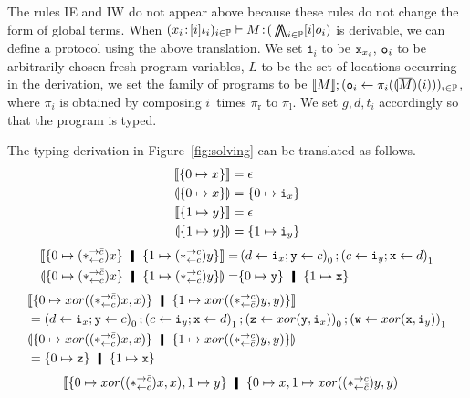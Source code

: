 The rules IE and IW do not appear above because these rules do not
change the form of global terms.
When $({x_i} \mathord{\colon\kern -2pt}{[i]\iota_i})_{i\in\mathbb{P}}
\vdash{M} \mathord{\colon\kern -2pt}{(}\operatorname*{\bigwedge\kern -8pt \bigwedge}_{i\in \mathbb{P}}[i]o_i)$ is
derivable,
we can define a protocol using the above translation.
We set $\mathtt i_i$ to be ${\texttt{x}}_{x_i}$, ${\texttt{o}}_i$ to be arbitrarily
chosen fresh program variables, $L$ to be the set of locations
occurring in the derivation, we set the family of programs to be
$\llbracket{M}\rrbracket; ({\texttt{o}}_i\leftarrow \pi_i(\llparenthesis{\overline M}\rrparenthesis(i)))_{i\in\mathbb{P}}$,
where $\pi_i$ is obtained by composing $i$~times $\pi_{\mathrm r}$ to
$\pi_{\mathrm l}$.
We set $g,d,t_i$ accordingly so that the program is typed.
 \begin{example}
  The typing derivation in Figure~\ref{fig:solving} can be translated
  as follows.
  \begin{align*}
   \llbracket{{\{0\mapsto x\}}}\rrbracket&= \epsilon\\
   \llparenthesis{{\{0\mapsto x\}}}\rrparenthesis &=
   \{0\mapsto \texttt{i}_x\} \\
   \llbracket{{\{1\mapsto y\}}}\rrbracket &=
   \epsilon\\
   \llparenthesis{{\{1\mapsto y\}}}\rrparenthesis &=
   \{1\mapsto \texttt{i}_y\}
  \end{align*}
  \begin{align*}
   \semo{{\{0\mapsto (\comodL)x\}} \hmid
   {\{1\mapsto (\comodR)y\}}}
   =&
   \left(d\leftarrow\p i_x; \p y \leftarrow c\right)_0;
   \left(c\leftarrow\p i_y; \p x \leftarrow d\right)_1\\
   \semoi{{\{0\mapsto (\comodL)x\}} \hmid
   {\{1\mapsto (\comodR)y\}}}
   =& \{0\mapsto \p y\}\hmid \{1\mapsto \p x\}
  \end{align*}
\begin{align*}
 &\semo{{\{0\mapsto xor((\comodL)x,x)\}}\hmid
  {\{1\mapsto xor((\comodR)y,y)\}}}\\
&= \left(d\leftarrow \p i_x; \p y\leftarrow c\right)_0;
 \left(c\leftarrow \p i_y; \p x\leftarrow d\right)_1;
 \left(\p z\leftarrow xor(\p y,\p i_x)\right)_0;
 \left(\p w\leftarrow xor(\p x,\p i_y)\right)_1
 \\
 &\semoi{{\{0\mapsto xor((\comodL)x,x)\}}\hmid
  \{1\mapsto xor((\comodR)y,y)\}} \\
 &= \{0\mapsto \p z\} \hmid \{1\mapsto \p x\}
\end{align*}
  \begin{align*}
&\llbracket
 {\{
  0\mapsto {xor((\comodL)x,x)}, 1\mapsto {y}
  \}}
  \hmid
  {\{
  0\mapsto {x},
  1\mapsto {xor((\comodR)y, y)}
}
\end{align*}
\end{example}
